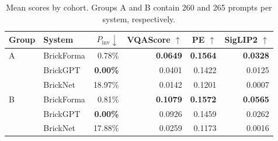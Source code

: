 \begin{table}[t]
\centering\small
\setlength{\tabcolsep}{3pt}
\begin{tabular}{llrrrr}
\toprule
Group & System & $P_{\mathrm{inv}}\downarrow$ & VQAScore $\uparrow$ & PE $\uparrow$ & SigLIP2 $\uparrow$ \\
\midrule
A & BrickForma & 0.78\% & \textbf{0.0649} & \textbf{0.1564} & \textbf{0.0328} \\
 & BrickGPT & \textbf{0.00\%} & 0.0401 & 0.1422 & 0.0125 \\
 & BrickNet & 18.97\% & 0.0142 & 0.1201 & 0.0007 \\
\midrule
B & BrickForma & 0.81\% & \textbf{0.1079} & \textbf{0.1572} & \textbf{0.0565} \\
 & BrickGPT & \textbf{0.00\%} & 0.0926 & 0.1459 & 0.0262 \\
 & BrickNet & 17.88\% & 0.0259 & 0.1173 & 0.0016 \\
\bottomrule
\end{tabular}
\caption{Mean scores by cohort. Groups A and B contain 260 and 265 prompts per system, respectively.}
\label{tab:cohort-results}
\end{table}
